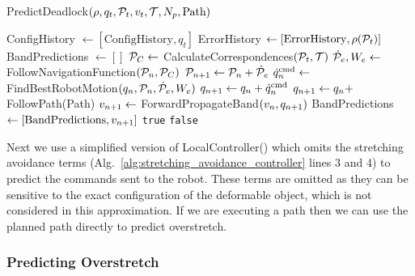 \begin{algorithm}[h]
\caption{PredictDeadlock$(\rho, q_t, \mathcal{P}_t, v_t, \mathcal{T}, N_p, \textrm{Path})$}
\begin{algorithmic}[1]
    \State ConfigHistory $\gets [\textrm{ConfigHistory}, q_t]$
    \State ErrorHistory $\gets [\textrm{ErrorHistory}, \rho(\mathcal{P}_t)]$
    \State BandPredictions $\gets []$
    \State $\mathcal{P}_C \gets$ CalculateCorrespondences$(\mathcal{P}_t, \mathcal{T})$
            \State $\dot{\mathcal{P}}_e, W_e \gets$ FollowNavigationFunction$(\mathcal{P}_n, \mathcal{P}_C)$
            \State $\mathcal{P}_{n + 1} \gets \mathcal{P}_n + \dot{\mathcal{P}}_e$
            \State $\dot{q}^{\textrm{cmd}}_n \gets$ FindBestRobotMotion$(q_n, \mathcal{P}_n, \dot{\mathcal{P}}_e, W_e)$
            \State $q_{n + 1} \gets q_n + \dot{q}^{\textrm{cmd}}_n$
        \Else
            \State $q_{n + 1} \gets q_n + $ FollowPath(Path)
        \EndIf
        \State $v_{n + 1} \gets$ ForwardPropagateBand$(v_n, q_{n + 1})$
        \State BandPredictions $\gets [\textrm{BandPredictions}, v_{n + 1}]$
    \EndFor
        \State \Return \texttt{true}
    \Else
        \State \Return \texttt{false}
    \EndIf
\end{algorithmic}
\label{alg:predict_deadlock}
\end{algorithm}


Next we use a simplified version of LocalController() which omits the stretching avoidance terms (Alg.~\ref{alg:stretching_avoidance_controller} lines 3 and 4) to predict the commands sent to the robot. These terms are omitted as they can be sensitive to the exact configuration of the deformable object, which is not considered in this approximation. If we are executing a path then we can use the planned path directly to predict overstretch.

\subsubsection{Predicting Overstretch}
\label{sec:overstretch}

